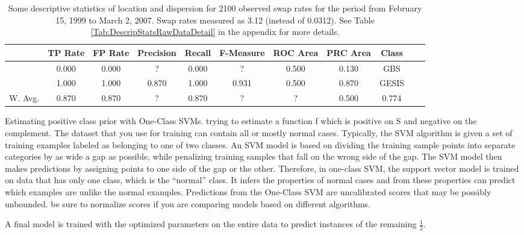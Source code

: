 \begin{table}[ht]
    \begin{center}
		\captionsetup{width= 430pt}
            {\footnotesize
            \begin{tabular}{l|cccccccccc}
                \hline \hline
                           &  TP Rate & FP Rate & Precision & Recall & F-Measure & ROC Area & PRC Area & Class \\
                \hline
                      & 0.000 & 0.000 & ? & 0.000 & ? & 0.500 & 0.130 & GBS &\\
                      & 1.000 & 1.000 & 0.870 & 1.000 & 0.931 & 0.500 & 0.870 & GESIS &\\
                \hline \hline
		 W. Avg. & 0.870 & 0.870 & ? & 0.870 & ? & ? & 0.500 & 0.774 &
            \end{tabular}}
        \caption{Some descriptive statistics of location and dispersion for 2100 observed swap rates for the period from February 15, 1999 to March 2, 2007. Swap rates measured as 3.12 (instead of 0.0312). See Table \ref{Tab:DescripStatsRawDataDetail} in the appendix for more details.}
\label{Tab:DescripStatsRawData}
\end{center}
\end{table}

Estimating positive class prior with One-Class SVMs. trying to estimate a function f which is positive on S and negative on the complement. The dataset that you use for training can contain all or mostly normal cases. Typically, the SVM algorithm is given a set of training examples labeled as belonging to one of two classes. An SVM model is based on dividing the training sample points into separate categories by as wide a gap as possible, while penalizing training samples that fall on the wrong side of the gap. The SVM model then makes predictions by assigning points to one side of the gap or the other. Therefore, in one-class SVM, the support vector model is trained on data that has only one class, which is the “normal” class. It infers the properties of normal cases and from these properties can predict which examples are unlike the normal examples.  Predictions from the One-Class SVM are uncalibrated scores that may be possibly unbounded. be sure to normalize scores if you are comparing models based on different algorithms.

A final model is trained with the optimized parameters on the entire data to predict instances of the remaining \(\frac{1}{2}\).

